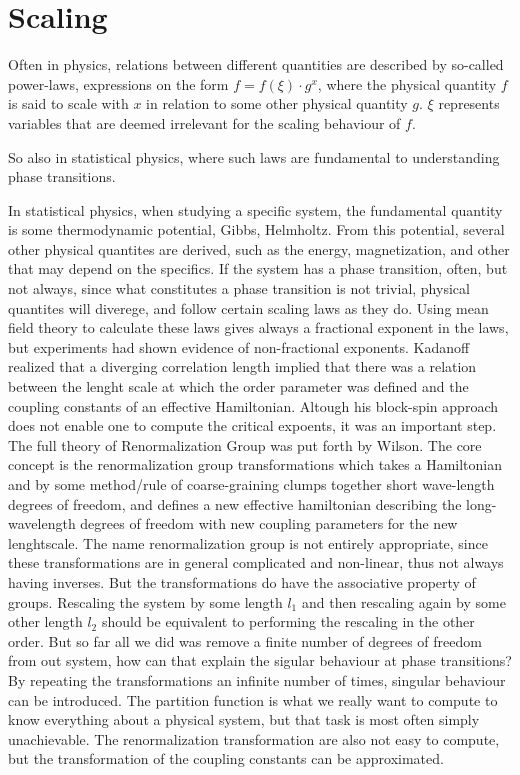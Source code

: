 \section{Scaling}
Often in physics, relations between different quantities are described by so-called power-laws, expressions on the form $f = f(\xi)\cdot g^{x}$, where the physical quantity $f$ is said to scale with $x$ in relation to some other physical quantity $g$. $\xi$ represents variables that are deemed irrelevant for the scaling behaviour of $f$.

So also in statistical physics, where such laws are fundamental to understanding phase transitions.

In statistical physics, when studying a specific system, the fundamental quantity is some thermodynamic potential,  Gibbs, Helmholtz. From this potential, several other physical quantites are derived, such as the energy, magnetization, and other that may depend on the specifics. 
If the system has a phase transition, often, but not always, since what constitutes a phase transition is not trivial, physical quantites will diverege, and follow certain scaling laws as they do. 
Using mean field theory to calculate these laws gives always a fractional exponent in the laws, but experiments had shown evidence of non-fractional exponents. 
Kadanoff realized that a diverging correlation length implied that there was a relation between the lenght scale at which the order parameter was defined and the coupling constants of an effective Hamiltonian. Altough his block-spin approach does not enable one to compute the critical expoents, it was an important step.
The full theory of Renormalization Group was put forth by Wilson.
The core concept is the renormalization group transformations which takes a Hamiltonian and by some method/rule of coarse-graining clumps together short wave-length degrees of freedom, and defines a new effective hamiltonian describing the long-wavelength degrees of freedom with new coupling parameters for the new lenghtscale.
The name renormalization group is not entirely appropriate, since these transformations are in general complicated and non-linear, thus not always having inverses. But the transformations do have the associative property of groups. Rescaling the system by some length $l_1$ and then rescaling again by some other length $l_2$ should be equivalent to performing the rescaling in the other order.
But so far all we did was remove a finite number of degrees of freedom from out system, how can that explain the sigular behaviour at phase transitions? By repeating the transformations an infinite number of times, singular behaviour can be introduced.
The partition function is what we really want to compute to know everything about a physical system, but that task is most often simply unachievable. The renormalization transformation are also not easy to compute, but the transformation of the coupling constants can be approximated.

